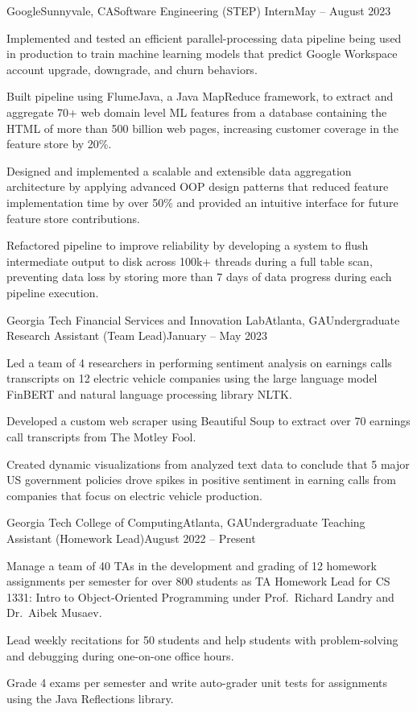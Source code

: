 \documentclass{article}
\begin{document}
\begin{flushleft}
    \begin{experience}{Google}{Sunnyvale, CA}{Software Engineering (STEP) Intern}{May -- August 2023}
        \item Implemented and tested an efficient parallel-processing data pipeline being used in production to train machine learning models that predict Google Workspace account upgrade, downgrade, and churn behaviors.
        \item Built pipeline using FlumeJava, a Java MapReduce framework, to extract and aggregate 70+ web domain level ML features from a database containing the HTML of more than 500 billion web pages, increasing customer coverage in the feature store by 20\%.
        \item Designed and implemented a scalable and extensible data aggregation architecture by applying advanced OOP design patterns that reduced feature implementation time by over 50\% and provided an intuitive interface for future feature store contributions.
        \item Refactored pipeline to improve reliability by developing a system to flush intermediate output to disk across 100k+ threads during a full table scan, preventing data loss by storing more than 7 days of data progress during each pipeline execution.
    \end{experience}

    \begin{experience}{Georgia Tech Financial Services and Innovation Lab}{Atlanta, GA}{Undergraduate Research Assistant (Team Lead)}{January -- May 2023}
        \item Led a team of 4 researchers in performing sentiment analysis on earnings calls transcripts on 12 electric vehicle companies using the large language model FinBERT and natural language processing library NLTK.
        \item Developed a custom web scraper using Beautiful Soup to extract over 70 earnings call transcripts from The Motley Fool.
        \item Created dynamic visualizations from analyzed text data to conclude that 5 major US government policies drove spikes in positive sentiment in earning calls from companies that focus on electric vehicle production.
    \end{experience}

    \begin{experience}{Georgia Tech College of Computing}{Atlanta, GA}{Undergraduate Teaching Assistant (Homework Lead)}{August 2022 -- Present}
        \item Manage a team of 40 TAs in the development and grading of 12 homework assignments per semester for over 800 students as TA Homework Lead for CS 1331: Intro to Object-Oriented Programming under Prof.~Richard Landry and Dr.~Aibek Musaev.
        \item Lead weekly recitations for 50 students and help students with problem-solving and debugging during one-on-one office hours.
        \item Grade 4 exams per semester and write auto-grader unit tests for assignments using the Java Reflections library.
    \end{experience}


\end{flushleft}
\end{document}
